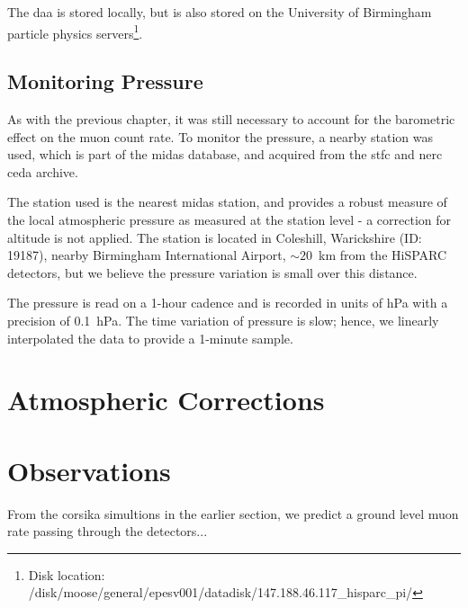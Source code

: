 The daa is stored locally, but is also stored on the University of Birmingham particle physics servers\footnote{Disk location: /disk/moose/general/epesv001/datadisk/147.188.46.117\_hisparc\_pi/}.

\subsection{Monitoring Pressure}

As with the previous chapter, it was still necessary to account for the barometric effect on the muon count rate. To monitor the pressure, a nearby station was used, which is part of the \gls{midas} database, and acquired from the \gls{stfc} and \gls{nerc} \gls{ceda} archive.

The station used is the nearest \gls{midas} station, and provides a robust measure of the local atmospheric pressure as measured at the station level - a correction for altitude is not applied. The station is located in Coleshill, Warickshire (ID: 19187), nearby Birmingham International Airport, $\sim 20$~km from the HiSPARC detectors, but we believe the pressure variation is small over this distance.

The pressure is read on a 1-hour cadence and is recorded in units of hPa with a precision of 0.1~hPa. The time variation of pressure is slow; hence, we linearly interpolated the data to provide a 1-minute sample.



\section{Atmospheric Corrections}\label{sec:HS_14008_atmospheric_correction}






\section{Observations}\label{sec:HS_14008_observations}

From the \gls{corsika} simultions in the earlier section, we predict a ground level muon rate passing through the detectors...

